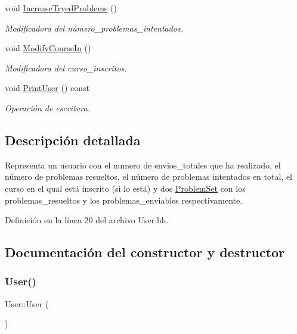\begin{DoxyCompactItemize}
void \mbox{\hyperlink{class_user_a45407a203e5fcb1be5e1ac9e2ff42faa}{Increase\+Tryed\+Problems}} ()
\begin{DoxyCompactList}\small\item\em Modificadora del número\+\_\+problemas\+\_\+intentados. \end{DoxyCompactList}\item 
void \mbox{\hyperlink{class_user_a344a091da9a9fee9208ce425ca206c03}{Modify\+Course\+In}} ()
\begin{DoxyCompactList}\small\item\em Modificadora del curso\+\_\+inscritos. \end{DoxyCompactList}\item 
void \mbox{\hyperlink{class_user_a690c6b93c7a3208ec8fe27df90b7a4f0}{Print\+User}} () const
\begin{DoxyCompactList}\small\item\em Operación de escritura. \end{DoxyCompactList}\end{DoxyCompactItemize}


\subsection{Descripción detallada}
Representa un usuario con el numero de envios\+\_\+totales que ha realizado, el número de problemas resueltos, el número de problemas intentados en total, el curso en el qual está inscrito (si lo está) y dos \mbox{\hyperlink{class_problem_set}{Problem\+Set}} con los problemas\+\_\+resueltos y los problemas\+\_\+enviables respectivamente. 

Definición en la línea 20 del archivo User.\+hh.



\subsection{Documentación del constructor y destructor}
\mbox{\label{class_user_a4a0137053e591fbb79d9057dd7d2283d}} 
\subsubsection{\texorpdfstring{User()}{User()}}
{\footnotesize\ttfamily User\+::\+User (\begin{DoxyParamCaption}{ }\end{DoxyParamCaption})}



